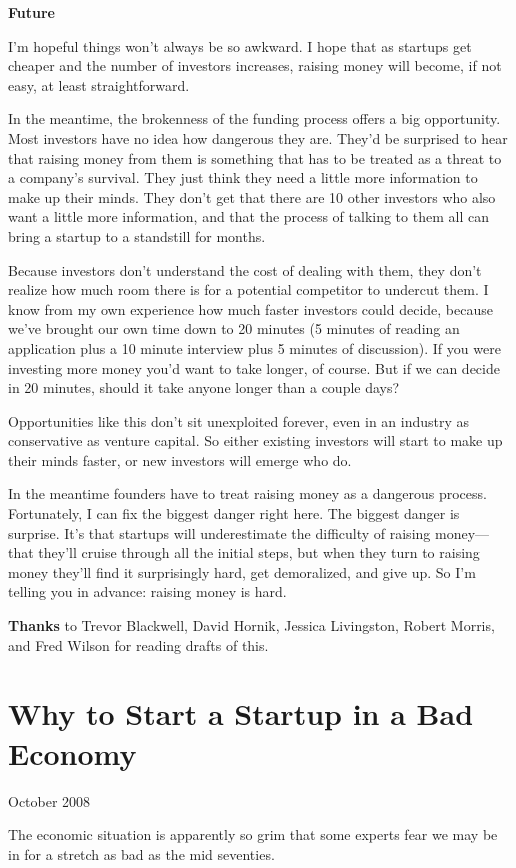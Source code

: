 \documentclass[12pt]{book}
\begin{document}
\textbf{Future}

I'm hopeful things won't always be so awkward. I hope that as startups
get cheaper and the number of investors increases, raising money will
become, if not easy, at least straightforward.

In the meantime, the brokenness of the funding process offers a big
opportunity. Most investors have no idea how dangerous they are. They'd
be surprised to hear that raising money from them is something that has
to be treated as a threat to a company's survival. They just think they
need a little more information to make up their minds. They don't get
that there are 10 other investors who also want a little more
information, and that the process of talking to them all can bring a
startup to a standstill for months.

Because investors don't understand the cost of dealing with them, they
don't realize how much room there is for a potential competitor to
undercut them. I know from my own experience how much faster investors
could decide, because we've brought our own time down to 20 minutes (5
minutes of reading an application plus a 10 minute interview plus 5
minutes of discussion). If you were investing more money you'd want to
take longer, of course. But if we can decide in 20 minutes, should it
take anyone longer than a couple days?

Opportunities like this don't sit unexploited forever, even in an
industry as conservative as venture capital. So either existing
investors will start to make up their minds faster, or new investors
will emerge who do.

In the meantime founders have to treat raising money as a dangerous
process. Fortunately, I can fix the biggest danger right here. The
biggest danger is surprise. It's that startups will underestimate the
difficulty of raising money---that they'll cruise through all the
initial steps, but when they turn to raising money they'll find it
surprisingly hard, get demoralized, and give up. So I'm telling you in
advance: raising money is hard.


\textbf{Thanks} to Trevor Blackwell, David Hornik, Jessica Livingston,
Robert Morris, and Fred Wilson for reading drafts of this.
\chapter{Why to Start a Startup in a Bad Economy}

October 2008

The economic situation is apparently so grim that some experts fear we
may be in for a stretch as bad as the mid seventies.
\end{document}
